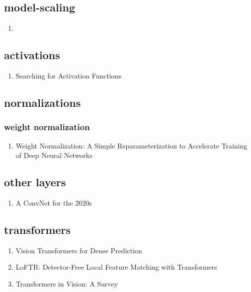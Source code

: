 \documentclass[acmlarge]{acmart}
\begin{document}
	\subsection{model-scaling}
	\begin{enumerate}
		\item
	\end{enumerate}
	\subsection{activations}
	\begin{enumerate}
		\item Searching for Activation Functions \cite{Ramachandran2018SearchingFA} 

	\end{enumerate}
	\subsection{normalizations}
		\subsubsection{weight normalization}
		\begin{enumerate}
			\item Weight Normalization: A Simple Reparameterization to Accelerate Training of Deep Neural Networks \cite{Salimans2016WeightNA} 

		\end{enumerate}
	\begin{enumerate}
	\end{enumerate}
	\subsection{other layers}
	\begin{enumerate}
		\item A ConvNet for the 2020s \cite{Liu2022ACF} 

	\end{enumerate}
	\subsection{transformers}
	\begin{enumerate}
		\item Vision Transformers for Dense Prediction \cite{Ranftl2021VisionTF} 

		\item LoFTR: Detector-Free Local Feature Matching with Transformers \cite{Sun2021LoFTRDL} 

		\item Transformers in Vision: A Survey \cite{Khan2022TransformersIV} 

	\end{enumerate}
\begin{enumerate}
\end{enumerate}
\end{document}
